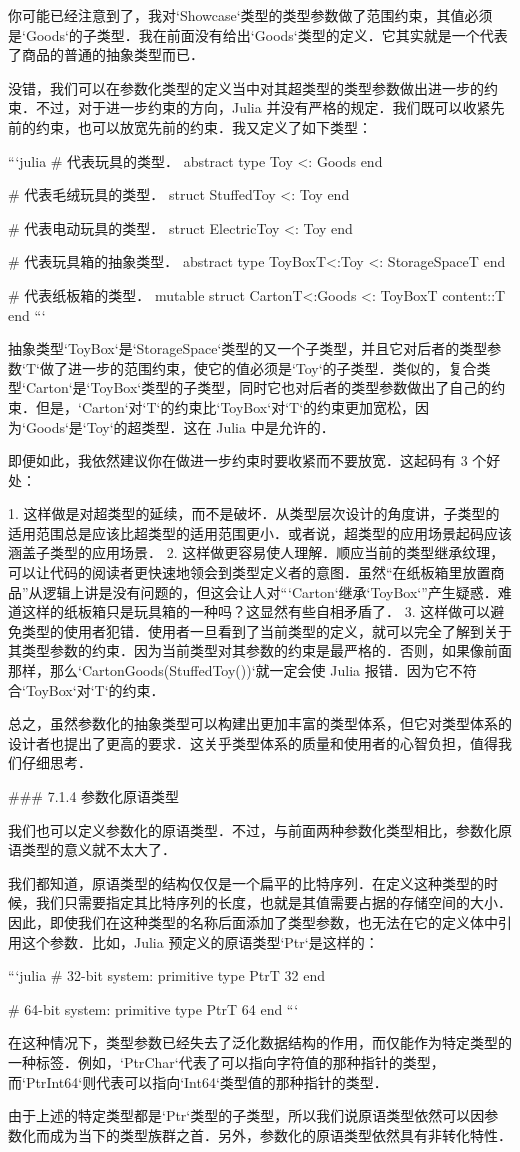你可能已经注意到了，我对`Showcase`类型的类型参数做了范围约束，其值必须是`Goods`的子类型．我在前面没有给出`Goods`类型的定义．它其实就是一个代表了商品的普通的抽象类型而已．

没错，我们可以在参数化类型的定义当中对其超类型的类型参数做出进一步的约束．不过，对于进一步约束的方向，Julia 并没有严格的规定．我们既可以收紧先前的约束，也可以放宽先前的约束．我又定义了如下类型：

```julia
# 代表玩具的类型．
abstract type Toy <: Goods end

# 代表毛绒玩具的类型．
struct StuffedToy <: Toy end

# 代表电动玩具的类型．
struct ElectricToy <: Toy end

# 代表玩具箱的抽象类型．
abstract type ToyBox{T<:Toy} <: StorageSpace{T} end

# 代表纸板箱的类型．
mutable struct Carton{T<:Goods} <: ToyBox{T}
    content::T
end
```

抽象类型`ToyBox`是`StorageSpace`类型的又一个子类型，并且它对后者的类型参数`T`做了进一步的范围约束，使它的值必须是`Toy`的子类型．类似的，复合类型`Carton`是`ToyBox`类型的子类型，同时它也对后者的类型参数做出了自己的约束．但是，`Carton`对`T`的约束比`ToyBox`对`T`的约束更加宽松，因为`Goods`是`Toy`的超类型．这在 Julia 中是允许的．

即便如此，我依然建议你在做进一步约束时要收紧而不要放宽．这起码有 3 个好处：

1. 这样做是对超类型的延续，而不是破坏．从类型层次设计的角度讲，子类型的适用范围总是应该比超类型的适用范围更小．或者说，超类型的应用场景起码应该涵盖子类型的应用场景．
2. 这样做更容易使人理解．顺应当前的类型继承纹理，可以让代码的阅读者更快速地领会到类型定义者的意图．虽然“在纸板箱里放置商品”从逻辑上讲是没有问题的，但这会让人对“`Carton`继承`ToyBox`”产生疑惑．难道这样的纸板箱只是玩具箱的一种吗？这显然有些自相矛盾了．
3. 这样做可以避免类型的使用者犯错．使用者一旦看到了当前类型的定义，就可以完全了解到关于其类型参数的约束．因为当前类型对其参数的约束是最严格的．否则，如果像前面那样，那么`Carton{Goods}(StuffedToy())`就一定会使 Julia 报错．因为它不符合`ToyBox`对`T`的约束．

总之，虽然参数化的抽象类型可以构建出更加丰富的类型体系，但它对类型体系的设计者也提出了更高的要求．这关乎类型体系的质量和使用者的心智负担，值得我们仔细思考．

### 7.1.4 参数化原语类型

我们也可以定义参数化的原语类型．不过，与前面两种参数化类型相比，参数化原语类型的意义就不太大了．

我们都知道，原语类型的结构仅仅是一个扁平的比特序列．在定义这种类型的时候，我们只需要指定其比特序列的长度，也就是其值需要占据的存储空间的大小．因此，即使我们在这种类型的名称后面添加了类型参数，也无法在它的定义体中引用这个参数．比如，Julia 预定义的原语类型`Ptr`是这样的：

```julia
# 32-bit system:
primitive type Ptr{T} 32 end

# 64-bit system:
primitive type Ptr{T} 64 end
```

在这种情况下，类型参数已经失去了泛化数据结构的作用，而仅能作为特定类型的一种标签．例如，`Ptr{Char}`代表了可以指向字符值的那种指针的类型，而`Ptr{Int64}`则代表可以指向`Int64`类型值的那种指针的类型．

由于上述的特定类型都是`Ptr`类型的子类型，所以我们说原语类型依然可以因参数化而成为当下的类型族群之首．另外，参数化的原语类型依然具有非转化特性．